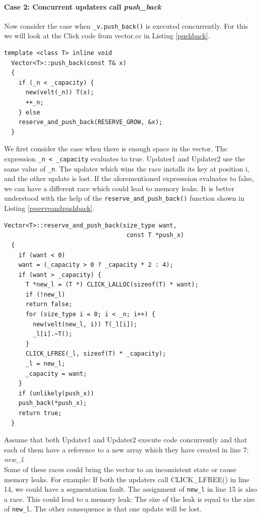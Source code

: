 \documentclass[a4paper,marginparwidth=50pt,marginparsep=10pt]{article}
\begin{document}
\paragraph{Case 2: Concurrent updaters call \emph{push\_back} }
Now consider the case when \verb+_v.push_back()+ is executed concurrently. For this we will look at the Click code from vector.cc in Listing \ref{pushback}.
\begin{lstlisting}[caption = The push\_back() function, label=pushback]
  template <class T> inline void
  Vector<T>::push_back(const T& x)
  {
    if (_n < _capacity) {
      new(velt(_n)) T(x);
      ++_n;
    } else
    reserve_and_push_back(RESERVE_GROW, &x);
  }
\end{lstlisting}
We first consider the case when there is enough space in the vector. The expression \verb$_n < _capacity$ evaluates to true. Updater1 and Updater2 use the same value of \verb+_n+. The updater which wins the race installs its key at position i, and the other update is lost. If the aforementioned expresssion evaluates to false, we can have a different race which could lead to memory leaks. It is better understood with the help of the \verb+reserve_and_push_back()+ function shown in Listing \ref{reserveandpushback}.
\begin{lstlisting}[caption= reserve\_and\_push\_back(), label =reserveandpushback]
  Vector<T>::reserve_and_push_back(size_type want, 
                                  const T *push_x)
  {
    if (want < 0)
    want = (_capacity > 0 ? _capacity * 2 : 4);
    if (want > _capacity) {
      T *new_l = (T *) CLICK_LALLOC(sizeof(T) * want);
      if (!new_l)
      return false;
      for (size_type i = 0; i < _n; i++) {
        new(velt(new_l, i)) T(_l[i]);
        _l[i].~T();
      }
      CLICK_LFREE(_l, sizeof(T) * _capacity);
      _l = new_l;
      _capacity = want;
    }
    if (unlikely(push_x))
    push_back(*push_x);
    return true;
  }
\end{lstlisting}
Assume that both Updater1 and Updater2 execute code concurrently and that each of them have a reference to a new array which they have created in line 7: \emph{new\_l}.
\\Some of these races could bring the vector to an inconsistent state or cause memory leaks. For example: If both the updaters call CLICK\_LFREE() in line 14, we could have a segmentation fault. The assignment of \verb+new_l+ in line 15 is also a race. This could lead to a memory leak: The size of the leak is equal to the size of \verb+new_l+. The other consequence is that one update will be lost.
\end{document}
